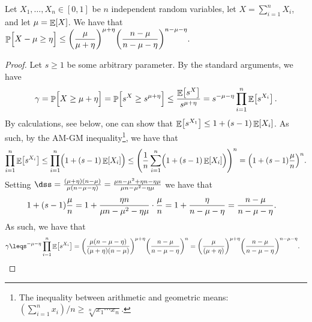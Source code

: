 \begin{theorem}
    Let $X_1, \ldots, X_n \in [0,1]$ be $n$ independent random
    variables, let $X = \sum_{i=1}^n X_i$, and let $\mu = \mathop{\mathbb{E}}\!\left[ {X} \right]$. We
    have that
    \begin{math}
        \ds%
        \Prob{\Bigl.X - \mu \geq \eta }%
        \leq%
        \pth{ \frac{\mu}{\mu + \eta} }^{\mu + \eta} %
        \pth{ \frac{n - \mu}{ n - \mu - \eta} }^{n - \mu - \eta}.
    \end{math}
\end{theorem}
\begin{proof}
    Let $s\geq 1$ be some arbitrary parameter. By the standard
    arguments, we have
    \begin{align*}
        \gamma%
        =%
        \Prob{\Bigl. X \geq \mu + \eta } %
        =%
        \Prob{\Bigl. s^X \geq s^{\mu + \eta} } %
        \leq%
        \frac{\Ex{s^X}}{s^{\mu + \eta}}%
        =%
        s^{-\mu - \eta} \prod_{i=1}^n \Ex{s^{X_i}}.
    \end{align*}
    By calculations, see  below, one can show that
    $\mathop{\mathbb{E}}\!\left[ {s^{X_1}} \right] \leq 1 + (s-1)\mathop{\mathbb{E}}\!\left[ {X_i} \right]$. As such, by the AM-GM
    inequality\footnote{The inequality between arithmetic and
       geometric means:
       $(\sum_{i=1}^n x_i) /n \geq \sqrt[n]{x_1\cdots x_n}$.}, we have
    that
    \begin{align*}
        \prod_{i=1}^n \Ex{s^{X_i}}%
        \leq%
        \prod_{i=1}^n \pth{\Bigl. 1 + (s-1)\Ex{X_i}}%
        \leq%
        \pth{\frac{1}{n}\sum_{i=1}^n \pth{\Bigl. 1 +
              (s-1)\Ex{X_i}}}^n%
        =%
        \pth{1 + (s-1) \frac{\mu}{n}}^n.%
    \end{align*}
    Setting
    \begin{math}
        \ds%
        s%
        =%
        \frac{ (\mu + \eta )(n-\mu)}{\mu(n-\mu - \eta)}%
        =%
        \frac{ \mu n - \mu^2 +\eta n - \eta \mu}{\mu n - \mu^2 -
           \eta\mu }%
    \end{math}
    we have that
    \begin{align*}
        \ds%
        1 + (s-1)\frac{\mu}{n}%
        &=%
        1 +%
        \frac{\eta n}{\mu n - \mu^2 - \eta\mu } \cdot \frac{\mu}{n}%
        =%
        1 +%
        \frac{\eta }{n - \mu - \eta } %
        =%
        \frac{ n- \mu}{n-\mu - \eta}.%
    \end{align*}
    As such, we have that
    \begin{align*}
        \gamma%
        &\leq%
        s^{-\mu - \eta} \prod_{i=1}^n \Ex{s^{X_i}}%
        =%
        \pth{\frac{\mu(n-\mu - \eta)}{ (\mu + \eta )(n-\mu)}}^{\mu +
           \eta} \pth{\frac{ n- \mu}{n-\mu - \eta}}^n%
        =%
        \pth{\frac{\mu}{ (\mu + \eta )}}^{\mu + \eta} \pth{\frac{ n-
              \mu}{n-\mu - \eta}}^{n-\mu -\eta}.
    \end{align*}
\end{proof}

